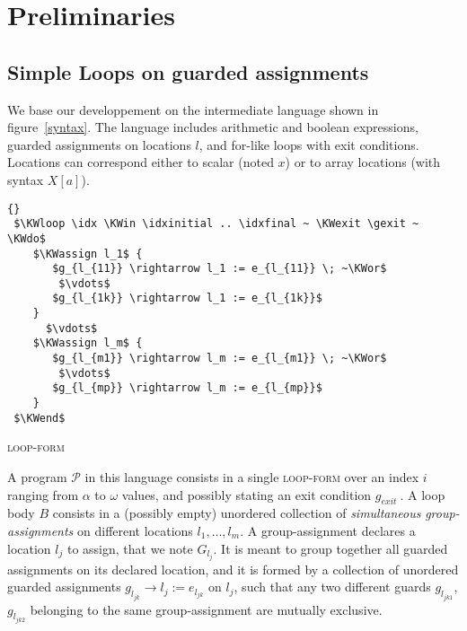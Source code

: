 \documentclass[a4paper,10pt]{article}
\newcommand{\prog}{\ensuremath{\mathcal{P}}\xspace}
\newcommand{\idx}{\ensuremath{i}\xspace}
\newcommand{\idxinitial}{\ensuremath{\alpha}\xspace}
\newcommand{\idxfinal}{\ensuremath{\omega}\xspace}
\newcommand{\KWloop}{\ensuremath{\mathrm{\textbf{loop}}~}}
\newcommand{\KWdo}{\ensuremath{\mathrm{\textbf{do}}~}}
\newcommand{\KWend}{\ensuremath{\mathrm{\textbf{end}}~}}
\newcommand{\KWin}{\ensuremath{~\mathrm{\textbf{in}}~}}
\newcommand{\KWexit}{\ensuremath{\mathrm{\textbf{exit when}}~}}
\newcommand{\KWassign}{\ensuremath{\mathrm{\textbf{assign}}~}}
\newcommand{\KWor}{\ensuremath{\mathrm{\textbf{or}}~}}
\newcommand{\gexit}{\ensuremath{\mathit{g_{exit}~}}}
\newcommand{\loopform}{\textsc{loop-form}\xspace}
\begin{document}
\section{Preliminaries}

\subsection{Simple Loops on guarded assignments}
\label{sec:simple-loops}
We base our developpement on the intermediate language shown in figure~\ref{syntax}.
The language includes arithmetic and boolean  expressions, guarded assignments on 
locations $l$, and for-like loops with exit conditions. Locations can correspond 
either to scalar (noted $x$) or to array locations (with syntax $X[a]$).
\begin{center}
\begin{lstlisting}[mathescape]{} 
 $\KWloop \idx \KWin \idxinitial .. \idxfinal ~ \KWexit \gexit ~ \KWdo$
    $\KWassign l_1$ {
       $g_{l_{11}} \rightarrow l_1 := e_{l_{11}} \; ~\KWor$
        $\vdots$
       $g_{l_{1k}} \rightarrow l_1 := e_{l_{1k}}$
    }
      $\vdots$
    $\KWassign l_m$ { 
       $g_{l_{m1}} \rightarrow l_m := e_{l_{m1}} \; ~\KWor$
        $\vdots$
       $g_{l_{mp}} \rightarrow l_m := e_{l_{mp}}$ 
    }
 $\KWend$
\end{lstlisting}
\loopform
\end{center}

A program \prog in this language consists in a single \loopform over an index \idx 
ranging from \idxinitial to \idxfinal values, and possibly stating an exit condition \gexit. 
A loop body $B$ consists in a (possibly empty) unordered collection of \emph{simultaneous} 
\textit{group-assignments} on different locations $l_1, \ldots, l_m$.
A group-assignment declares a location $l_j$ to assign, that we note $G_{l_j}$.  
It is meant to group together all guarded assignments on its declared location, 
and it is formed by  a collection of unordered guarded assignments 
$g_{l_{jk}} \rightarrow l_j := e_{l_{jk}}$ on $l_j$, such that any  two different guards 
$g_{l_{jk1}}$, $g_{l_{jk2}}$ belonging to the same group-assignment are mutually exclusive.
\end{document}
